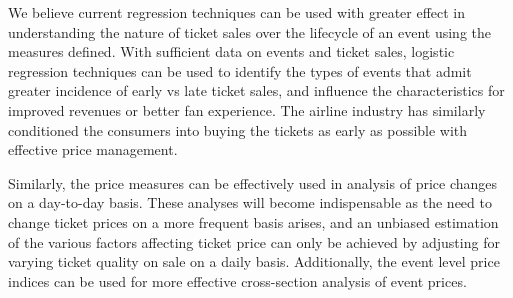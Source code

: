 \documentclass[letterpaper, 12pt]{article}
\begin{document}
We believe current regression techniques can be used with greater effect in understanding the nature of ticket sales over the lifecycle of an event using the measures defined. With sufficient data on events and ticket sales, logistic regression techniques can be used to identify the types of events that admit greater incidence of early vs late ticket sales, and influence the characteristics for improved revenues or better fan experience. The airline industry has similarly conditioned the consumers into buying the tickets as early as possible with effective price management.

Similarly, the price measures can be effectively used in analysis of price changes on a day-to-day basis. These analyses will become indispensable as the need to change ticket prices on a more frequent basis arises, and an unbiased estimation of the various factors affecting ticket price can only be achieved by adjusting for varying ticket quality on sale on a daily basis. Additionally, the event level price indices can be used for more effective cross-section analysis of event prices.



\end{document}
